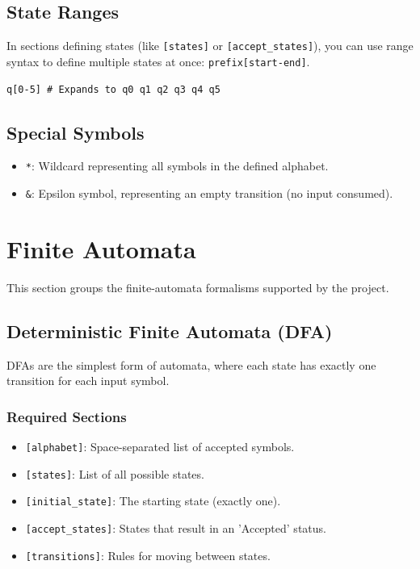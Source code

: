 \documentclass{article}
\begin{document}
\subsection{State Ranges}
In sections defining states (like \texttt{[states]} or \texttt{[accept\_states]}), you can use range syntax to define multiple states at once: \texttt{prefix[start-end]}.
\begin{lstlisting}
q[0-5] # Expands to q0 q1 q2 q3 q4 q5
\end{lstlisting}

\subsection{Special Symbols}
\begin{itemize}
    \item \texttt{*}: Wildcard representing all symbols in the defined alphabet.
    \item \texttt{\&}: Epsilon symbol, representing an empty transition (no input consumed).
\end{itemize}

\clearpage
\section{Finite Automata}
This section groups the finite-automata formalisms supported by the project.

\subsection{Deterministic Finite Automata (DFA)}
DFAs are the simplest form of automata, where each state has exactly one transition for each input symbol.

\subsubsection{Required Sections}
\begin{itemize}
    \item \texttt{[alphabet]}: Space-separated list of accepted symbols.
    \item \texttt{[states]}: List of all possible states.
    \item \texttt{[initial\_state]}: The starting state (exactly one).
    \item \texttt{[accept\_states]}: States that result in an 'Accepted' status.
    \item \texttt{[transitions]}: Rules for moving between states.
\end{itemize}
\end{document}
